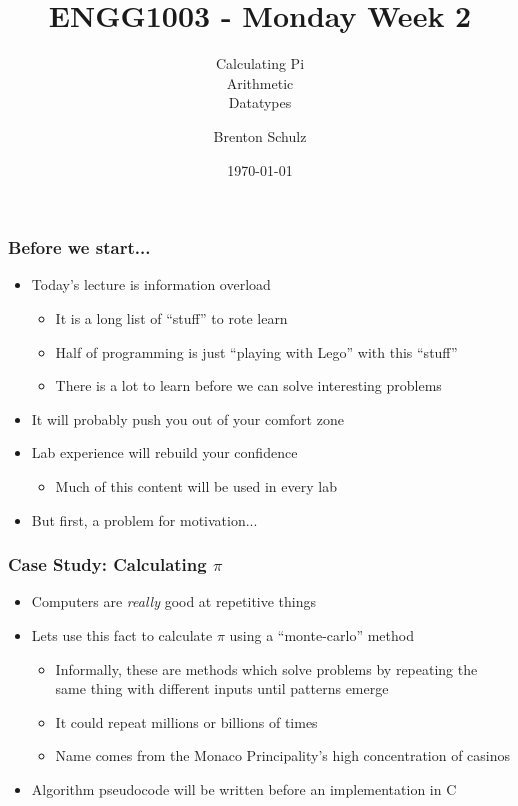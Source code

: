 \documentclass[14pt]{beamer}
\title{ENGG1003 - Monday Week 2}
\subtitle{Calculating Pi\\Arithmetic\\Datatypes}
\author{Brenton Schulz}
\institute{University of Newcastle}
\date{\today}
\begin{document}
\titlepage

\begin{frame}
\frametitle{Before we start...}
\begin{itemize}
\item Today's lecture is information overload
	\begin{itemize}
		\item It is a long list of ``stuff'' to rote learn
		\item Half of programming is just ``playing with Lego'' with this ``stuff''
		\item There is a lot to learn before we can solve interesting problems
	\end{itemize}
\item It will probably push you out of your comfort zone
\item Lab experience will rebuild your confidence
	\begin{itemize}
		\item Much of this content will be used in every lab
	\end{itemize}
\item But first, a problem for motivation...
\end{itemize}
\end{frame}

\begin{frame}
\frametitle{Case Study: Calculating $\pi$}
\begin{itemize}
\item Computers are \textit{really} good at repetitive things
\item Lets use this fact to calculate $\pi$ using a ``monte-carlo'' method
	\begin{itemize}
		\item Informally, these are methods which solve problems by repeating the same thing with different inputs until patterns emerge
		\item It could repeat millions or billions of times
		\item Name comes from the Monaco Principality's high concentration of casinos
	\end{itemize}
\item Algorithm pseudocode will be written before an implementation in C
\end{itemize}
\end{frame}
\end{document}
